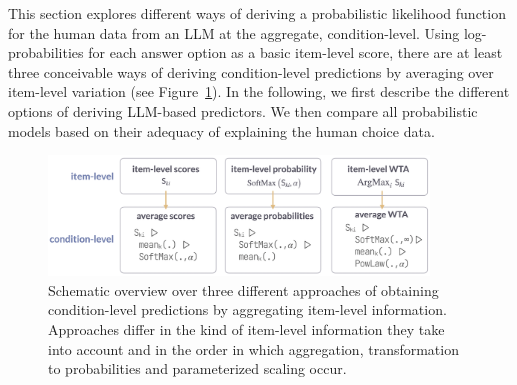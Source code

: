 \documentclass[fleqn]{article}
\begin{document}
This section explores different ways of deriving a probabilistic likelihood function for the human data from an LLM at the aggregate, condition-level.
Using log-probabilities for each answer option as a basic item-level score, there are at least three conceivable ways of deriving condition-level predictions by averaging over item-level variation (see Figure~\ref{fig:measures-overview}).
In the following, we first describe the different options of deriving LLM-based predictors.
We then compare all probabilistic models based on their adequacy of explaining the human choice data.

\begin{figure}
  \centering
  \includegraphics[width=0.9\textwidth]{00-pics/measures-overview.png}
  \caption{
    Schematic overview over three different approaches of obtaining condition-level predictions by aggregating item-level information.
    Approaches differ in the kind of item-level information they take into account and in the order in which aggregation, transformation to probabilities and parameterized scaling occur.
  }
  \label{fig:measures-overview}
\end{figure}
\end{document}
